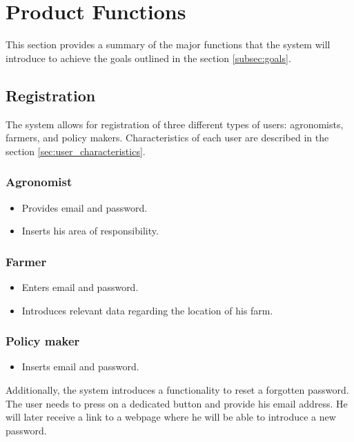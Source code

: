 \section{Product Functions}

This section provides a summary of the major functions that the system will introduce to achieve the goals outlined in the section \ref{subsec:goals}.

\subsection{Registration}
The system allows for registration of three different types of users: agronomists, farmers, and policy makers. Characteristics of each user are described in the section \ref{sec:user_characteristics}.

\subsubsection*{Agronomist}

\begin{itemize}
    \item Provides email and password.
    \item Inserts his area of responsibility.
\end{itemize}

\subsubsection*{Farmer}

\begin{itemize}
    \item Enters email and password.
    \item Introduces relevant data regarding the location of his farm.
\end{itemize}

\subsubsection*{Policy maker}

\begin{itemize}
    \item Inserts email and password.
\end{itemize}

Additionally, the system introduces a functionality to reset a forgotten password. The user needs to press on a dedicated button and provide his email address. He will later receive a link to a webpage where he will be able to introduce a new password. 

